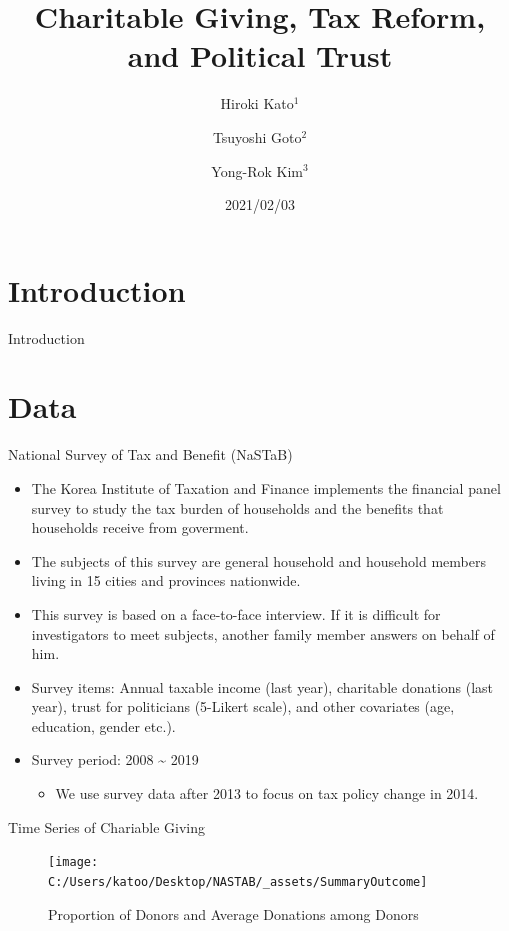 \documentclass[
  ignorenonframetext,
]{beamer}
\title{Charitable Giving, Tax Reform, and Political Trust}
\author{Hiroki Kato\(^1\) \and Tsuyoshi Goto\(^2\) \and Yong-Rok Kim\(^3\)}
\date{2021/02/03}
\institute{\(^1\)Osaka University \and \(^2\)Chiba University \and \(^3\)Kobe University}
\providecommand{\tightlist}{%
  \setlength{\itemsep}{0pt}\setlength{\parskip}{0pt}}
\begin{document}
\frame{\titlepage}

\begin{frame}
\end{frame}

\hypertarget{introduction}{%
\section{Introduction}\label{introduction}}

\begin{frame}{Introduction}
\protect\hypertarget{introduction-1}{}
\end{frame}

\hypertarget{data}{%
\section{Data}\label{data}}

\begin{frame}{National Survey of Tax and Benefit (NaSTaB)}
\protect\hypertarget{national-survey-of-tax-and-benefit-nastab}{}
\begin{itemize}
\tightlist
\item
  The Korea Institute of Taxation and Finance implements the financial panel survey to study the tax burden of households and the benefits that households receive from goverment.
\item
  The subjects of this survey are general household and household members living in 15 cities and provinces nationwide.
\item
  This survey is based on a face-to-face interview. If it is difficult for investigators to meet subjects, another family member answers on behalf of him.
\item
  Survey items: Annual taxable income (last year), charitable donations (last year), trust for politicians (5-Likert scale), and other covariates (age, education, gender etc.).
\item
  Survey period: 2008 \textasciitilde{} 2019

  \begin{itemize}
  \tightlist
  \item
    We use survey data after 2013 to focus on tax policy change in 2014.
  \end{itemize}
\end{itemize}
\end{frame}

\begin{frame}{Time Series of Chariable Giving}
\protect\hypertarget{time-series-of-chariable-giving}{}
\begin{figure}
\texttt{[image: C:/Users/katoo/Desktop/NASTAB/\_assets/SummaryOutcome]} \caption{Proportion of Donors and Average Donations among Donors}\label{fig:unnamed-chunk-1}
\end{figure}
\end{frame}
\end{document}

